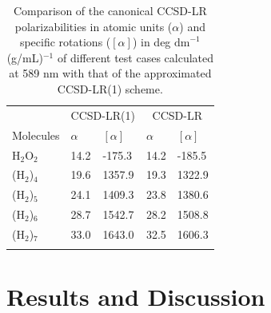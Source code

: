  \begin{table}[h]
 \caption{{\footnotesize Comparison of the canonical CCSD-LR polarizabilities in atomic units ($\alpha$) and specific rotations ($[\alpha]$) in deg $\text{dm}^{-1}$(g/mL)$^{-1}$ of different test cases calculated at 589 nm with that of the approximated CCSD-LR(1) scheme.}}
\centering
\begin{tabular}{lllll}
\hline
 & \multicolumn{2}{c}{CCSD-LR(1)} & \multicolumn{2}{c}{CCSD-LR} \\
\cline{2-5}
 Molecules & $\alpha$ & $[\alpha]$ & $\alpha$ & $[\alpha]$ \\ 
\hline
H$_2$O$_2$  & 14.2 & -175.3 &  14.2 &  -185.5   \\
\hline
(H$_2$)$_4$ & 19.6 & 1357.9 &  19.3 &  1322.9 \\
\hline
(H$_2$)$_5$ & 24.1  & 1409.3 & 23.8 &  1380.6  \\
\hline
(H$_2$)$_6$ & 28.7 & 1542.7 & 28.2 &   1508.8 \\
\hline
(H$_2$)$_7$ & 33.0 & 1643.0 & 32.5 &   1606.3  \\
\hline
\\
\end{tabular}
\label{cclr_justify}
\end{table}

\section{Results and Discussion}

